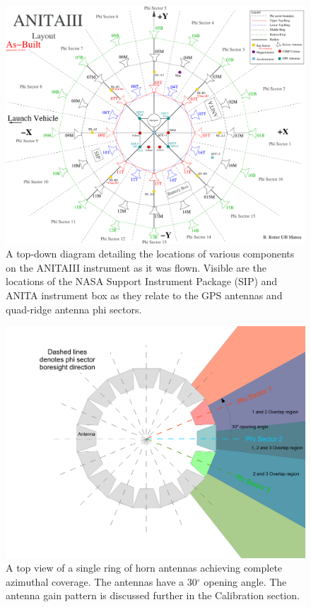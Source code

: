 \begin{figure}
\centering
	\includegraphics[width=\textwidth]{figures/ANITA3_layout_asBuilt}
	\caption{A top-down diagram detailing the locations of various components on the ANITAIII instrument as it was flown.  Visible are the locations of the NASA Support Instrument Package (SIP) and ANITA instrument box as they relate to the GPS antennas and quad-ridge antenna phi sectors.}
	\label{fig:ANITA3_asBuilt}
\end{figure}

\begin{figure}
\centering
	\includegraphics[width=\textwidth]{figures/phiSectors} 
	\caption{A top view of a single ring of horn antennas achieving complete azimuthal coverage.  The antennas have a  30$^{\circ}$  opening angle.  The antenna gain pattern is discussed further in the Calibration section.}
	\label{fig:phiSectors}
\end{figure}

